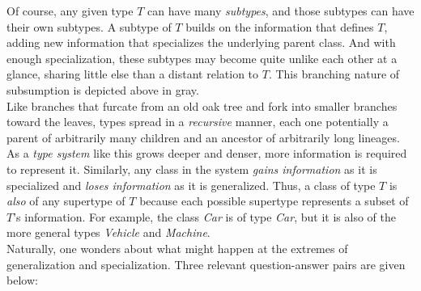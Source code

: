 Of course, any given type $T$ can have many \textit{subtypes}, and those subtypes can have their own subtypes. A subtype of $T$ builds on the information that defines $T$, adding new information that specializes the underlying parent class. And with enough specialization, these subtypes may become quite unlike each other at a glance, sharing little else than a distant relation to $T$. This branching nature of subsumption is depicted above in gray. \\

Like branches that furcate from an old oak tree and fork into smaller branches toward the leaves, types spread in a \textit{recursive} manner, each one potentially a parent of arbitrarily many children and an ancestor of arbitrarily long lineages. As a \textit{type system} like this grows deeper and denser, more information is required to represent it. Similarly, any class in the system \textit{gains information} as it is specialized and \textit{loses information} as it is generalized. Thus, a class of type $T$ is \textit{also} of any supertype of $T$ because each possible supertype represents a subset of $T$'s information. For example, the class \textit{Car} is of type \textit{Car}, but it is also of the more general types \textit{Vehicle} and \textit{Machine}. \\

Naturally, one wonders about what might happen at the extremes of generalization and specialization. Three relevant question-answer pairs are given below: \\

